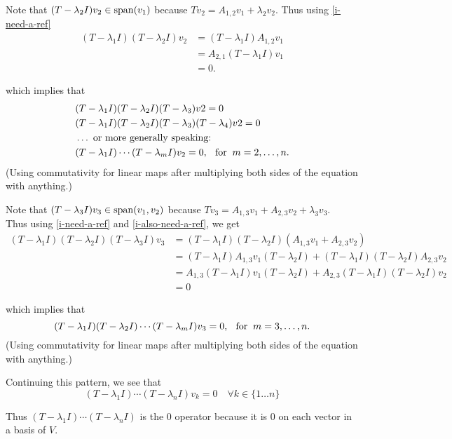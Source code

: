 \begin{prf}
  Note that $(T-\lambda_2 I) v_2 \in \operatorname{span} (v_1)$ because $T v_2 = A_{1,2} v_1 + \lambda_2 v_2$. Thus using \eqref{i-need-a-ref}
  \begin{equation}
    \begin{aligned}
      \label{i-also-need-a-ref}
      (T- \lambda_1 I) (T- \lambda_2 I) v_2
      &= (T- \lambda_1 I) A_{1,2}v_1  \\
      &= A_{2,1}(T- \lambda_1 I) v_1  \\
      &=0.
    \end{aligned}
  \end{equation}

  which implies that
  \begin{equation}
    \begin{aligned}
        &(T-\lambda_1 I) (T-\lambda_2 I)(T-\lambda_3)v2 = 0 \\
        &(T-\lambda_1 I) (T-\lambda_2 I)(T-\lambda_3)(T-\lambda_4)v2 = 0 \\
        &\ldots \text{ or more generally speaking:} \\
        &(T-\lambda_1 I) \cdots (T-\lambda_m I) v_2 = 0, \;\;\, \text{for}\;\; m = 2, \ldots, n.
    \end{aligned}
  \end{equation}
  (Using commutativity for linear maps after multiplying both sides of the equation with anything.)
  \bigbreak

  Note that $(T-\lambda_3 I) v_3 \in \operatorname{span} (v_1, v_2)$ because $T v_3 = A_{1,3} v_1 +   A_{2,3} v_2 + \lambda_3 v_3$. \\
  Thus using \eqref{i-need-a-ref} and \eqref{i-also-need-a-ref}, we get
  \begin{equation}
    \begin{aligned}
      (T- \lambda_1 I) (T- \lambda_2 I) (T- \lambda_3 I)v_3
      &=(T- \lambda_1 I) (T- \lambda_2 I)(A_{1,3} v_1 +   A_{2,3} v_2)  \\
        &= (T- \lambda_1 I)A_{1,3} v_1(T- \lambda_2 I)+(T- \lambda_1 I)(T- \lambda_2 I)A_{2,3} v_2 \\
        &= A_{1,3}(T- \lambda_1 I) v_1(T- \lambda_2 I)+A_{2,3}(T- \lambda_1 I)(T- \lambda_2 I) v_2 \\
            &= 0
    \end{aligned}
  \end{equation}

  which implies that
  \begin{equation}
    (T-\lambda_1 I) (T-\lambda_2 I) \cdots (T-\lambda_m I) v_3= 0, \;\;\, \text{for}\;\; m = 3, \ldots, n.
  \end{equation}
  (Using commutativity for linear maps after multiplying both sides of the equation with anything.)
  \bigbreak

  Continuing this pattern, we see that
  \begin{equation}
    (T-\lambda_1 I) \cdots (T- \lambda_n I) v_k = 0 \quad \forall k \in \{ 1\ldots n \}
  \end{equation}

  Thus $(T-\lambda_1 I) \cdots (T- \lambda_n I)$ is the $0$ operator because it is $0$ on each vector in a basis of $V$.
\end{prf}

